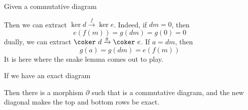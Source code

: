 Given a commutative diagram
%
\begin{center}
\end{center}
%
Then we can extract $\ker d \xrightarrow{f} \ker e$. Indeed, if $dm = 0$, then
%
\[ e(f(m)) = g(dm) = g(0) = 0 \]
%
dually, we can extract $\coker\ d \xrightarrow{g} \coker\ e$. If $a = dm$, then
%
\[ g(a) = g(dm) = e(f(m)) \]
%
It is here where the snake lemma comes out to play.

\begin{theorem}
    If we have an exact diagram
    \begin{center}
    \end{center}
    Then there is a morphism $\partial$ such that
    is a commutative diagram, and the new diagonal makes the top and bottom rows be exact.
\end{theorem}
